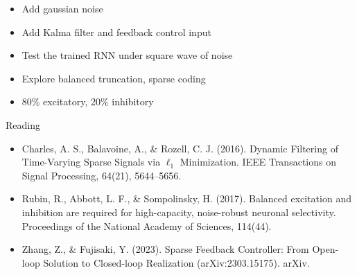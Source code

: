 \documentclass[12pt, a4paper]{article}
\begin{document}
\begin{itemize}
    \item Add gaussian noise
    \item Add Kalma filter and feedback control input
    \item Test the trained RNN under square wave of noise
    \item Explore balanced truncation, sparse coding
    \item 80\% excitatory, 20\% inhibitory
\end{itemize}

\noindent
Reading

\begin{itemize}
    \item Charles, A. S., Balavoine, A., \& Rozell, C. J. (2016). Dynamic Filtering of Time-Varying Sparse Signals via $\ell _1$ Minimization. IEEE Transactions on Signal Processing, 64(21), 5644–5656.
    \item Rubin, R., Abbott, L. F., \& Sompolinsky, H. (2017). Balanced excitation and inhibition are required for high-capacity, noise-robust neuronal selectivity. Proceedings of the National Academy of Sciences, 114(44).
    \item Zhang, Z., \& Fujisaki, Y. (2023). Sparse Feedback Controller: From Open-loop Solution to Closed-loop Realization (arXiv:2303.15175). arXiv.
\end{itemize}

\newpage
\end{document}
